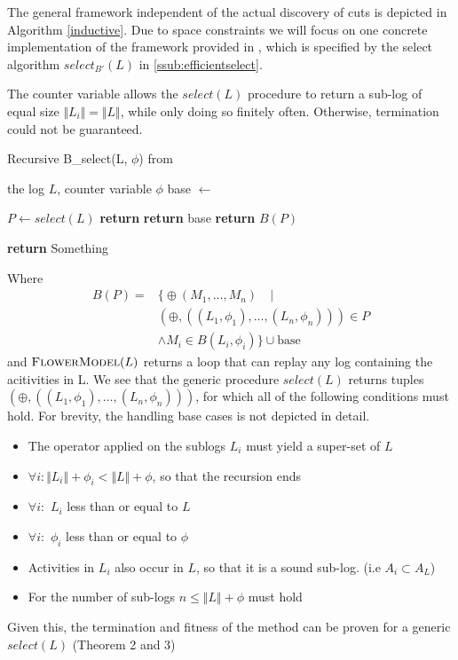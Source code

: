 \documentclass[a4paper]{IEEEtran}
\begin{document}
The general framework independent of the actual discovery of cuts is depicted in Algorithm \ref{inductive}. Due to space constraints we will focus on one concrete implementation of the framework provided in \cite{inductivemining-constructive}, which is specified by the select algorithm $select_{B'}(L)$ in \ref{ssub:efficientselect}. 

The counter variable allows the $select(L)$ procedure to return a sub-log of equal size $\Vert L_i \Vert = \Vert L \Vert$, while only doing so finitely often. Otherwise, termination could not be guaranteed.

\begin{algorithm}[h!]
\caption{Recursive B_{select}(L, $\phi$) from \cite{inductivemining-constructive}}\label{inductive-mining}
\begin{algorithmic}[1]
\Require the log $L$, counter variable $\phi$
\State base $\gets $ 

\State $P \gets select(L)$
        \State \textbf{return}  
    \Else 
        \State \textbf{return} base
    \EndIf
\EndIf
\State \textbf{return} $B(P)$

\State \textbf{return} Something
\end{algorithmic}
\label{inductive}
\end{algorithm}

Where
\begin{align*}
B(P) = & \Big\{ \oplus (M_1, \dots ,M_n) \quad | \\ &(\oplus, ((L_1, \phi_1), \dots, (L_n, \phi_n))) \in P \\ &\wedge M_i \in B(L_i, \phi_i) \Big\} \cup \text{base}
\end{align*}
and $\textproc{FlowerModel}(L)$ returns a loop that can replay any log containing the acitivities in L.
We see that the generic procedure $select(L)$ returns tuples $(\oplus, ((L_1, \phi_1), \dots, (L_n, \phi_n)))$, for which all of the following conditions must hold.
For brevity, the handling base cases is not depicted in detail. 
\begin{itemize}
    \item The operator applied on the sublogs $L_i$ must yield a super-set of $L$
    \item $\forall i : \Vert L_i \Vert + \phi_i < \Vert L \Vert + \phi $, so that the recursion ends
    \item $\forall i :$ $L_i$ less than or equal to $L$
    \item $\forall i :$ $\phi_i$ less than or equal to $\phi$
    \item Activities in $L_i$ also occur in $L$, so that it is a sound sub-log. (i.e $A_i \subset A_L$)
    \item For the number of sub-logs $n \leq \Vert L \Vert + \phi$ must hold
\end{itemize}
Given this, the termination and fitness of the method can be proven for a generic $select(L)$ \cite{inductivemining-constructive} (Theorem 2 and 3)
\end{document}

